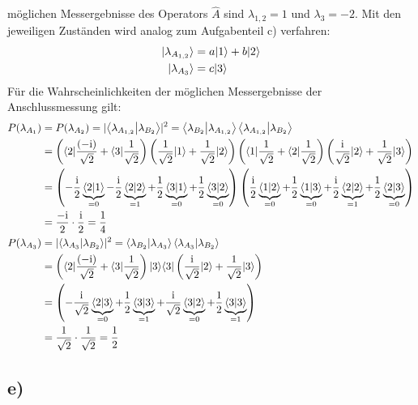     \justifying möglichen Messergebnisse des Operators $\hat{A}$ sind $\lambda_{1,2}=1$ und $\lambda_3=-2$. Mit den jeweiligen
    Zuständen wird analog zum Aufgabenteil c) verfahren:
    \begin{align*}
    \lvert\lambda_{A_{1,2}}\rangle &= a\lvert1\rangle+b\lvert2\rangle\\
    \lvert\lambda_{A_3}\rangle &= c\lvert3\rangle
    \end{align*}
    Für die Wahrscheinlichkeiten der möglichen Messergebnisse der Anschlussmessung gilt: 
    \begin{align*}
    P(\lambda_{A_1}) &= P(\lambda_{A_2}) = \lvert\braket{\lambda_{A_{1,2}}}{\lambda_{B_2}}\rvert^2 =\braket{\lambda_{B_2}}{\lambda_{A_{1,2}}}\braket{\lambda_{A_{1,2}}}{\lambda_{B_2}}\\
    &= \left( \langle2\rvert\frac{(-\text{i})}{\sqrt{2}}+\langle3\rvert\frac{1}{\sqrt{2}} \right) \left( \frac{1}{\sqrt{2}} \lvert1\rangle+\frac{1}{\sqrt{2}}\lvert2\rangle \right)
    \left( \langle1\rvert\frac{1}{\sqrt{2}}+\langle2\rvert\frac{1}{\sqrt{2}} \right) \left( \frac{\text{i}}{\sqrt{2}} \lvert2\rangle+\frac{1}{\sqrt{2}}\lvert3\rangle \right)\\
    &= \left( -\frac{\text{i}}{2} \underbrace{\braket{2}{1}}_{=0} - \frac{\text{i}}{2} \underbrace{\braket{2}{2}}_{=1} + 
    \frac{1}{2} \underbrace{\braket{3}{1}}_{=0} + \frac{1}{2} \underbrace{\braket{3}{2}}_{=0} \right)
    \left( \frac{\text{i}}{2} \underbrace{\braket{1}{2}}_{=0} + \frac{1}{2} \underbrace{\braket{1}{3}}_{=0} + 
    \frac{\text{i}}{2} \underbrace{\braket{2}{2}}_{=1} + \frac{1}{2} \underbrace{\braket{2}{3}}_{=0} \right)\\
    &= \frac{-\text{i}}{2} \cdot \frac{\text{i}}{2} = \frac{1}{4}\\
    P(\lambda_{A_3}) &= \lvert\braket{\lambda_{A_3}}{\lambda_{B_2}}\rvert^2 =\braket{\lambda_{B_2}}{\lambda_{A_3}}\braket{\lambda_{A_3}}{\lambda_{B_2}}\\
    &= \left( \langle2\rvert\frac{(-\text{i})}{\sqrt{2}}+\langle3\rvert\frac{1}{\sqrt{2}} \right) \lvert3\rangle
    \langle3\rvert \left( \frac{\text{i}}{\sqrt{2}} \lvert2\rangle+\frac{1}{\sqrt{2}}\lvert3\rangle \right)\\
    &= \left( -\frac{\text{i}}{\sqrt{2}} \underbrace{\braket{2}{3}}_{=0} + \frac{1}{2} \underbrace{\braket{3}{3}}_{=1} + 
    \frac{\text{i}}{\sqrt{2}} \underbrace{\braket{3}{2}}_{=0} + \frac{1}{2} \underbrace{\braket{3}{3}}_{=1} \right)\\
    &= \frac{1}{\sqrt{2}} \cdot \frac{1}{\sqrt{2}} = \frac{1}{2}
    \end{align*}

    \subsection{e)}

